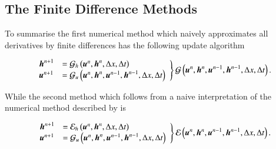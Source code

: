 \documentclass[SingleSpace,12pt,Proceedings]{Serre_ASCE}
\begin{document}
\subsection{The Finite Difference Methods}
To summarise the first numerical method which naively approximates all derivatives by finite differences has the following update algorithm
\begin{linenomath*}
\begin{gather}
\left.
\begin{array}{l l}
\boldsymbol{h}^{n+1}&=\mathcal{G}_h\left(\boldsymbol{u}^n,\boldsymbol{h}^n, \Delta x, \Delta t \right) \\
\boldsymbol{u}^{n+1}&=\mathcal{G}_u\left(\boldsymbol{u}^n,\boldsymbol{h}^n, \boldsymbol{u}^{n-1},\boldsymbol{h}^{n-1}, \Delta x, \Delta t \right)
\end{array} \right\rbrace \mathcal{G}\left(\boldsymbol{u}^n,\boldsymbol{h}^n, \boldsymbol{u}^{n-1},\boldsymbol{h}^{n-1}, \Delta x, \Delta t \right).
\end{gather}
\end{linenomath*}
While the second method which follows from a naive interpretation of the numerical method described by  is
\begin{linenomath*}
\begin{gather}
\left.
\begin{array}{l l}
\boldsymbol{h}^{n+1}&=\mathcal{E}_h\left(\boldsymbol{u}^n,\boldsymbol{h}^n, \Delta x, \Delta t \right) \\
\boldsymbol{u}^{n+1}&=\mathcal{G}_u\left(\boldsymbol{u}^n,\boldsymbol{h}^n, \boldsymbol{u}^{n-1},\boldsymbol{h}^{n-1}, \Delta x, \Delta t \right)
\end{array} \right\rbrace \mathcal{E}\left(\boldsymbol{u}^n,\boldsymbol{h}^n, \boldsymbol{u}^{n-1},\boldsymbol{h}^{n-1}, \Delta x, \Delta t \right).
\end{gather}
\end{linenomath*}
\end{document}
